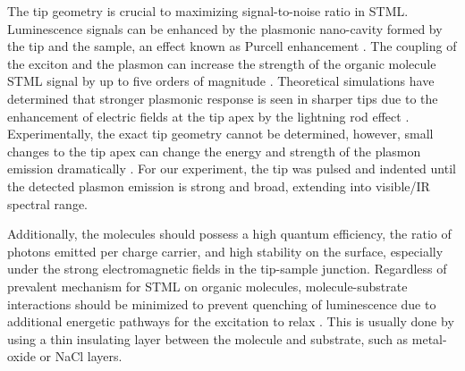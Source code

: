 The tip geometry is crucial to maximizing signal-to-noise ratio in \ac{STML}. Luminescence signals can be enhanced by the plasmonic nano-cavity formed by the tip and the sample, an effect known as Purcell enhancement \citep{purcell1946spontaneous}. The coupling of the exciton and the plasmon can increase the strength of the organic molecule \ac{STML} signal by up to five orders of magnitude \citep{chen2015molecular}. Theoretical simulations have determined that stronger plasmonic response is seen in sharper tips due to the enhancement of electric fields at the tip apex by the lightning rod effect \citep{novotny2012principles, aizpurua2000role}. Experimentally, the exact tip geometry cannot be determined, however, small changes to the tip apex can change the energy and strength of the plasmon emission dramatically \citep{meguro2002origin}. For our experiment, the tip was pulsed and indented until the detected plasmon emission is strong and broad, extending into visible/IR spectral range. 

Additionally, the molecules should possess a high quantum efficiency, the ratio of photons emitted per charge carrier, and high stability on the surface, especially under the strong electromagnetic fields in the tip-sample junction. Regardless of prevalent mechanism for \ac{STML} on organic molecules, molecule-substrate interactions should be minimized to prevent quenching of luminescence due to additional energetic pathways for the excitation to relax \citep{kuhnke2017atomic, rossel2010fluorescence}. This is usually done by using a thin insulating layer between the molecule and substrate, such as metal-oxide or NaCl layers. 









\endinput








\subsection{garbage}
\begin{equation}
    I_t \propto e^{-2kz},
\end{equation}

where $k$ is 

Has proven to be powerful in understanding the topological and electronic features of surfaces near the atomic level. 

